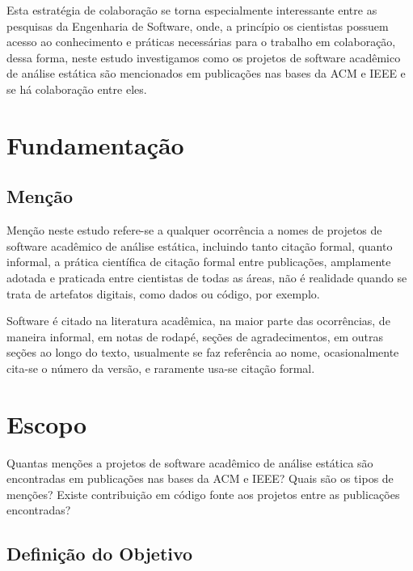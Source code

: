 Esta estratégia de colaboração se torna especialmente interessante entre as
pesquisas da Engenharia de Software, onde, a princípio os cientistas possuem
acesso ao conhecimento e práticas necessárias para o trabalho em colaboração,
dessa forma, neste estudo investigamos como os projetos de software acadêmico
de análise estática são mencionados em publicações nas bases da ACM e IEEE e se
há colaboração entre eles.


\section{Fundamentação} \label{estudo2:fundamentacao} %

\subsection{Menção}

Menção neste estudo refere-se a qualquer ocorrência a nomes de projetos de
software acadêmico de análise estática, incluindo tanto citação formal, quanto
informal, a prática científica de citação formal entre publicações, amplamente
adotada e praticada entre cientistas de todas as áreas, não é realidade quando
se trata de artefatos digitais, como dados ou código, por exemplo.

Software é citado na literatura acadêmica, na maior parte das ocorrências, de
maneira informal, em notas de rodapé, seções de agradecimentos, em outras
seções ao longo do texto, usualmente se faz referência ao nome, ocasionalmente
cita-se o número da versão, e raramente usa-se citação formal.


\section{Escopo} \label{estudo2:escopo} %

Quantas menções a projetos de software acadêmico de análise estática são
encontradas em publicações nas bases da ACM e IEEE? Quais são os tipos de
menções? Existe contribuição em código fonte aos projetos entre as publicações
encontradas?

\subsection{Definição do Objetivo}

